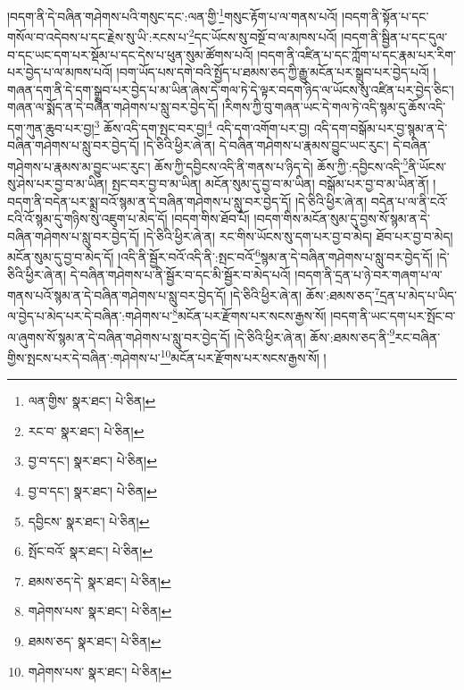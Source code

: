 །བདག་ནི་དེ་བཞིན་གཤེགས་པའི་གསུང་དང་:ལན་གྱི་\footnote{ལན་གྱིས་  སྣར་ཐང་།  པེ་ཅིན། }གསུང་རྟོག་པ་ལ་གནས་པའོ། །བདག་ནི་སྟོན་པ་དང་གསོལ་བ་འདེབས་པ་དང་རྗེས་སུ་ཡི་:རངས་པ་\footnote{རང་བ་  སྣར་ཐང་།  པེ་ཅིན། }དང་ཡོངས་སུ་བསྔོ་བ་ལ་མཁས་པའོ། །བདག་ནི་སྦྱིན་པ་དང་དུལ་བ་དང་ཡང་དག་པར་སྡོམ་པ་དང་དེས་པ་ཕུན་སུམ་ཚོགས་པའོ། །བདག་ནི་འཛིན་པ་དང་ཀློག་པ་དང་རྣམ་པར་རིག་པར་བྱེད་པ་ལ་མཁས་པའོ། །བག་ཡོད་པས་དགེ་བའི་སྤྱོད་པ་ཐམས་ཅད་ཀྱི་རྒྱུ་མངོན་པར་སྒྲུབ་པར་བྱེད་པའོ། །གཞན་དག་ནི་དེ་དག་སྒྲུབ་པར་བྱེད་པ་མ་ཡིན་ཞེས་དེ་གལ་ཏེ་དེ་ལྟར་བདག་ཉིད་ལ་ཡོངས་སུ་འཛིན་པར་བྱེད་ཅིང་། གཞན་ལ་སྨོད་ན་དེ་བཞིན་གཤེགས་པ་སླུ་བར་བྱེད་དོ། །རིགས་ཀྱི་བུ་གཞན་ཡང་དེ་གལ་ཏེ་འདི་སྙམ་དུ་ཆོས་འདི་དག་ཀུན་ཆུབ་པར་བྱ།\footnote{བྱ་བ་དང་།  སྣར་ཐང་།  པེ་ཅིན། } ཆོས་འདི་དག་སྤང་བར་བྱ།\footnote{བྱ་བ་དང་།  སྣར་ཐང་།  པེ་ཅིན། } འདི་དག་འགོག་པར་བྱ། འདི་དག་བསྒོམ་པར་བྱ་སྙམ་ན་དེ་བཞིན་གཤེགས་པ་སླུ་བར་བྱེད་དོ། །དེ་ཅིའི་ཕྱིར་ཞེ་ན། དེ་བཞིན་གཤེགས་པ་རྣམས་བྱུང་ཡང་རུང་། དེ་བཞིན་གཤེགས་པ་རྣམས་མ་བྱུང་ཡང་རུང་། ཆོས་ཀྱི་དབྱིངས་འདི་ནི་གནས་པ་ཉིད་དེ། ཆོས་ཀྱི་:དབྱིངས་འདི་\footnote{དབྱིངས་  སྣར་ཐང་།  པེ་ཅིན། }ནི་ཡོངས་སུ་ཤེས་པར་བྱ་བ་མ་ཡིན། སྤང་བར་བྱ་བ་མ་ཡིན། མངོན་སུམ་དུ་བྱ་བ་མ་ཡིན། བསྒོམ་པར་བྱ་བ་མ་ཡིན་ནོ། །བདག་ནི་བདེན་པར་སྨྲ་བའོ་སྙམ་ན་དེ་བཞིན་གཤེགས་པ་སླུ་བར་བྱེད་དོ། །དེ་ཅིའི་ཕྱིར་ཞེ་ན། བདེན་པ་ལ་ནི་ངའོ་ངའི་འོ་སྙམ་དུ་གཉིས་སུ་འཇུག་པ་མེད་དོ། །བདག་གིས་ཐོབ་པོ། །བདག་གིས་མངོན་སུམ་དུ་བྱས་སོ་སྙམ་ན་དེ་བཞིན་གཤེགས་པ་སླུ་བར་བྱེད་དོ། །དེ་ཅིའི་ཕྱིར་ཞེ་ན། རང་གིས་ཡོངས་སུ་དག་པར་བྱ་བ་མེད། ཐོབ་པར་བྱ་བ་མེད། མངོན་སུམ་དུ་བྱ་བ་མེད་དོ། །འདི་ནི་སྦྱོར་བའོ་འདི་ནི་:སྤང་བའོ་\footnote{སྤོང་བའོ་  སྣར་ཐང་།  པེ་ཅིན། }སྙམ་ན་དེ་བཞིན་གཤེགས་པ་སླུ་བར་བྱེད་དོ། །དེ་ཅིའི་ཕྱིར་ཞེ་ན། དེ་བཞིན་གཤེགས་པ་ནི་སྦྱོར་བ་དང་མི་སྦྱོར་བ་མེད་པའོ། །བདག་ནི་དྲན་པ་ཉེ་བར་གཞག་པ་ལ་གནས་པའོ་སྙམ་ན་དེ་བཞིན་གཤེགས་པ་སླུ་བར་བྱེད་དོ། །དེ་ཅིའི་ཕྱིར་ཞེ་ན། ཆོས་:ཐམས་ཅད་\footnote{ཐམས་ཅད་དེ་  སྣར་ཐང་།  པེ་ཅིན། }དྲན་པ་མེད་པ་ཡིད་ལ་བྱེད་པ་མེད་པར་དེ་བཞིན་:གཤེགས་པ་\footnote{གཤེགས་པས་  སྣར་ཐང་།  པེ་ཅིན། }མངོན་པར་རྫོགས་པར་སངས་རྒྱས་སོ། །བདག་ནི་ཡང་དག་པར་སྤོང་བ་ལ་ཞུགས་སོ་སྙམ་ན་དེ་བཞིན་གཤེགས་པ་སླུ་བར་བྱེད་དོ། །དེ་ཅིའི་ཕྱིར་ཞེ་ན། ཆོས་:ཐམས་ཅད་ནི་\footnote{ཐམས་ཅད་  སྣར་ཐང་།  པེ་ཅིན། }རང་བཞིན་གྱིས་སྤངས་པར་དེ་བཞིན་:གཤེགས་པ་\footnote{གཤེགས་པས་  སྣར་ཐང་།  པེ་ཅིན། }མངོན་པར་རྫོགས་པར་སངས་རྒྱས་སོ། །
